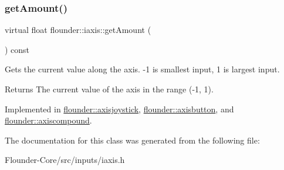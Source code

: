 \subsubsection{\texorpdfstring{get\+Amount()}{getAmount()}}
{\footnotesize\ttfamily virtual float flounder\+::iaxis\+::get\+Amount (\begin{DoxyParamCaption}{ }\end{DoxyParamCaption}) const\hspace{0.3cm}{\ttfamily [pure virtual]}}



Gets the current value along the axis. -\/1 is smallest input, 1 is largest input. 

\begin{DoxyReturn}{Returns}
The current value of the axis in the range (-\/1, 1). 
\end{DoxyReturn}


Implemented in \hyperlink{classflounder_1_1axisjoystick_ae1c3dafedcb9458be0172e83f4197dac}{flounder\+::axisjoystick}, \hyperlink{classflounder_1_1axisbutton_aa5589f11ec6a9f4e6d01727903581539}{flounder\+::axisbutton}, and \hyperlink{classflounder_1_1axiscompound_aad0f38f1a532c269cd0e803953861400}{flounder\+::axiscompound}.



The documentation for this class was generated from the following file\+:\begin{DoxyCompactItemize}
\item 
Flounder-\/\+Core/src/inputs/iaxis.\+h\end{DoxyCompactItemize}
